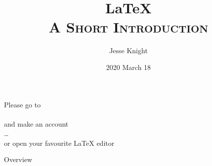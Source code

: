 \documentclass[11pt,aspectratio=169]{beamer}
\title[\LaTeX: A Short Introduction]{\LaTeX\\\textsc{\small{A Short Introduction}}}
\author[\href{\github}{\tiny\texttt{\github}} \hspace{0.2\linewidth} Jesse Knight]
{Jesse Knight}
\institute{University of Toronto\\Libraries}
\date{2020 March 18}
\begin{document}
\begin{frame}
  \centering\Large
  Please go to
  \\
  \href{https://www.overleaf.com}{}
  \\
  and make an account
  \\\dots\\
  or open your favourite \LaTeX{} editor
\end{frame}
\begin{frame}
  \maketitle
\end{frame}
\begin{frame}[label=overview]{Overview}
  \tableofcontents
\end{frame}
\end{document}
